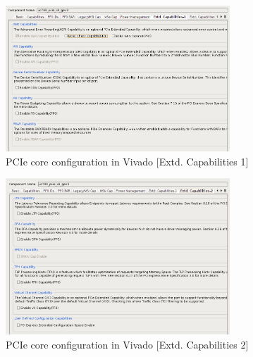 \begin{figure}[H]
\centering
\includegraphics[width=0.75\textwidth]{pictures/pcie_core_extcapa1.png}
\caption{PCIe core configuration in Vivado [Extd. Capabilities 1]}
\label{fig:pcie_core_config8}
\end{figure}
\newpage
\begin{figure}[H]
\centering
\includegraphics[width=0.75\textwidth]{pictures/pcie_core_extcapa2.png}
\caption{PCIe core configuration in Vivado [Extd. Capabilities 2]}
\label{fig:pcie_core_config9}
\end{figure}



